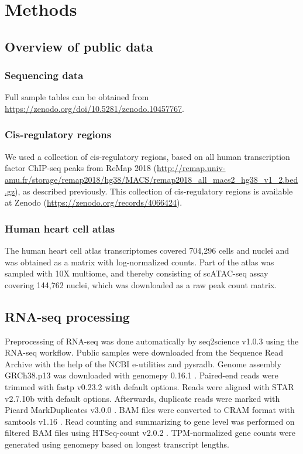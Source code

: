 \section{Methods}

\subsection{Overview of public data}

\subsubsection{Sequencing data}

Full sample tables can be obtained from \url{https://zenodo.org/doi/10.5281/zenodo.10457767}.

\subsubsection{Cis-regulatory regions}

We used a collection of cis-regulatory regions, based on all human transcription factor ChIP-seq peaks from ReMap 2018\cite{Chneby2017} (\url{http://remap.univ-amu.fr/storage/remap2018/hg38/MACS/remap2018_all_macs2_hg38_v1_2.bed.gz}), as described previously\cite{Xu_2020}. This collection of cis-regulatory regions is available at Zenodo (\url{https://zenodo.org/records/4066424}).

\subsubsection{Human heart cell atlas}

The human heart cell atlas transcriptomes covered 704,296 cells and nuclei and was obtained as a matrix with log-normalized counts\cite{HHCA_RNA_gene_matrix}. Part of the atlas was sampled with 10X multiome, and thereby consisting of scATAC-seq assay covering 144,762 nuclei, which was downloaded as a raw peak count matrix\cite{HHCA_ATAC_peak_matrix}.

\subsection{RNA-seq processing}

Preprocessing of RNA-seq was done automatically by seq2science v1.0.3 \cite{seq2science} using the RNA-seq workflow. Public samples were downloaded from the Sequence Read Archive \cite{Leinonen2010} with the help of the NCBI e-utilities and pysradb\cite{Choudhary2019}. Genome assembly GRCh38.p13 was downloaded with genomepy 0.16.1 \cite{Frlich2023}. Paired-end reads were trimmed with fastp v0.23.2 \cite{Chen2018} with default options. Reads were aligned with STAR v2.7.10b \cite{Dobin2012} with default options. Afterwards, duplicate reads were marked with Picard MarkDuplicates v3.0.0 \cite{picard}. BAM files were converted to CRAM format with samtools v1.16 \cite{Danecek2021}. Read counting and summarizing to gene level was performed on filtered BAM files using HTSeq-count v2.0.2 \cite{Anders2014}. TPM-normalized gene counts were generated using genomepy based on longest transcript lengths.

